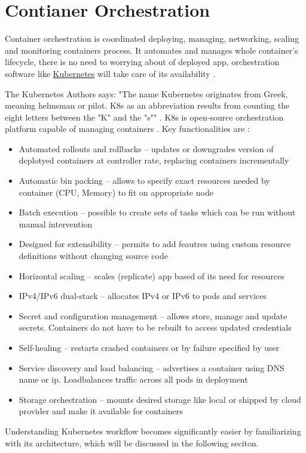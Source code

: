 
\section{Contianer Orchestration}
\label{sec:ContianerOrchestration}

Container orchestration is coordinated deploying, managing, networking, scaling and monitoring containers process. It automates and manages whole container's lifecycle, there is no need to worrying about of deployed app, orchestration software like \href{https://kubernetes.io/}{Kubernetes} will take care of its availability \cite{RedhatContainerization}.

The Kubernetes Authors says: "The name Kubernetes originates from Greek, meaning helmsman or pilot. K8s as an abbreviation results from counting the eight letters between the "K" and the "s"" \cite{KubernetesDocs}. K8s is open-source orchestration platform capable of managing containers \cite{KubernetesDocs}. Key functionalities are \cite{KubernetesDocs}:

\begin{itemize}
    \item Automated rollouts and rollbacks -- updates or downgrades version of deplotyed containers at controller rate, replacing containers incrementally
    \item Automatic bin packing --  allows to specify exact resources needed by container (CPU, Memory) to fit on appropriate node
    \item Batch execution -- possible to create sets of tasks which can be run without manual intervention
    \item Designed for extensibility -- permits to add feautres using custom resource definitions without changing source code
    \item Horizontal scaling -- scales (replicate) app based of its need for resources
    \item IPv4/IPv6 dual-stack -- allocates IPv4 or IPv6 to pods and services
    \item Secret and configuration management -- allows store, manage and update secrets. Containers do not have to be rebuilt to access updated  credentials
    \item Self-healing -- restarts crashed containers or by failure specified by user
    \item Service discovery and load balancing -- advertises a container using DNS name or ip. Loadbalances traffic across all pods in deployment
    \item Storage orchestration -- mounts desired storage like local or shipped by cloud provider and make it available for containers
\end{itemize}
Understanding Kubernetes workflow becomes significantly easier by familiarizing with its architecture, which will be discussed in the following seciton.



